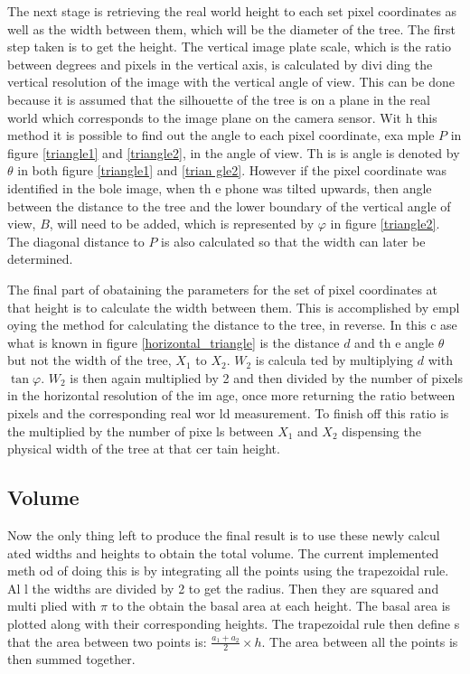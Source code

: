 The next stage is retrieving the real world height to each set pixel coordinates
 as well as the width between them, which will be the diameter of the tree. %
 The 
first step taken is to get the height. The vertical image plate scale, which is %
the ratio between degrees and pixels in the vertical axis, is calculated by divi
ding the vertical resolution of the image with the vertical angle of view. This 
can be done because it is assumed that the silhouette of the tree is on a plane %
in the real world which corresponds to the image plane on the camera sensor. Wit
h this method it is possible to find out the angle to each pixel coordinate, exa
mple $P$ in figure \ref{triangle1} and \ref{triangle2}, in the angle of view. Th
is is angle is denoted by $\theta$ in both figure \ref{triangle1} and \ref{trian
gle2}. However if the pixel coordinate was identified in the bole image, when th
e phone was tilted upwards, then angle between the distance to the tree and the 
lower boundary of the vertical angle of view, $B$, will need to be added, which 
is represented by $\varphi$ in figure \ref{triangle2}. The diagonal distance to 
$P$ is also calculated so that the width can later be determined.

The final part of obataining %
the parameters for the set of pixel coordinates at 
that height is to calculate the width between them. This is accomplished by empl
oying the method for calculating the distance to the tree, in reverse. In this c
ase what is known in figure \ref{horizontal_triangle} is the distance $d$ and th
e angle $\theta$ but not the width of the tree, $X_1$ to $X_2$. $W_2$ is calcula
ted by multiplying $d$ with $\tan{\varphi}$. $W_2$ is then again multiplied by 2
 and then divided by the number of pixels in the horizontal resolution of the im
age, once more returning the ratio between pixels and the corresponding real wor
ld measurement. To finish off this ratio is the multiplied by the number of pixe
ls between $X_1$ and $X_2$ dispensing %
the physical width of the tree at that cer
tain height.


\subsection{Volume}
Now the only thing left to produce the final result is to use these newly calcul
ated widths and heights to obtain the total volume. The current implemented meth
od of doing this is by integrating all the points using the trapezoidal rule. Al
l the widths are divided by 2 to get the radius. Then they are squared and multi
plied with $\pi$ to the obtain the basal area at each height. The basal area is 
plotted along with their corresponding heights. The trapezoidal rule then define
s that the area between two points is: $\frac{a_1 + a_2}{2} \times h$. The area 
between all the points is then summed together.



